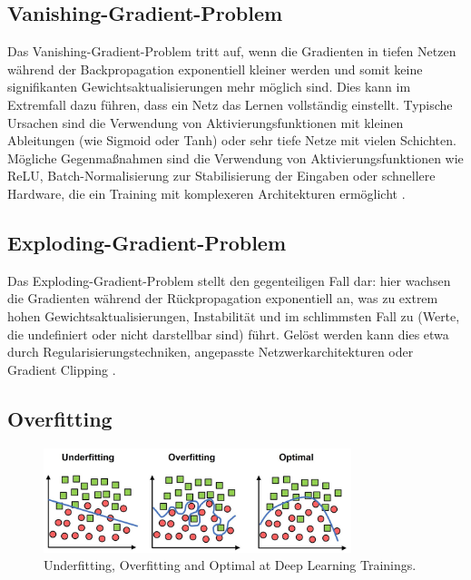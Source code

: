 \subsection{Vanishing-Gradient-Problem}

Das Vanishing-Gradient-Problem tritt auf, wenn die Gradienten in tiefen Netzen während der Backpropagation exponentiell kleiner werden und somit keine signifikanten Gewichtsaktualisierungen mehr möglich sind. Dies kann im Extremfall dazu führen, dass ein Netz das Lernen vollständig einstellt. Typische Ursachen sind die Verwendung von Aktivierungsfunktionen mit kleinen Ableitungen (wie Sigmoid oder Tanh) oder sehr tiefe Netze mit vielen Schichten. Mögliche Gegenmaßnahmen sind die Verwendung von Aktivierungsfunktionen wie \acrshort{ReLU}, Batch-Normalisierung zur Stabilisierung der Eingaben oder schnellere Hardware, die ein Training mit komplexeren Architekturen ermöglicht \cite{Alzubaidi2021}.  

\subsection{Exploding-Gradient-Problem}

Das Exploding-Gradient-Problem stellt den gegenteiligen Fall dar: hier wachsen die Gradienten während der Rückpropagation exponentiell an, was zu extrem hohen Gewichtsaktualisierungen, Instabilität und im schlimmsten Fall zu  (Werte, die undefiniert oder nicht darstellbar sind) führt. Gelöst werden kann dies etwa durch Regularisierungstechniken, angepasste Netzwerkarchitekturen oder Gradient Clipping \cite{Alzubaidi2021}.  

\subsection{Overfitting}

\begin{figure}[h]
    \centering
    \includegraphics[width=0.8\textwidth]{images/011Fundamentals/overfitting.jpg}
    \caption{Underfitting, Overfitting and Optimal at Deep Learning Trainings. \cite{overfitting_pic} }
    \label{fig:overfitting}
\end{figure}


